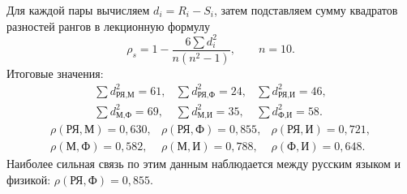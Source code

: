 Для каждой пары вычисляем $d_i = R_i-S_i$, затем подставляем сумму квадратов разностей рангов в лекционную формулу
\[
  \rho_s = 1 - \frac{6\sum d_i^2}{n(n^2-1)}, \qquad n=10.
\]
Итоговые значения:
\[
\begin{array}{lll}
  \sum d^2_{\text{РЯ},\text{М}}=61, &
  \sum d^2_{\text{РЯ},\text{Ф}}=24, &
  \sum d^2_{\text{РЯ},\text{И}}=46,\\
  \sum d^2_{\text{М},\text{Ф}}=69, &
  \sum d^2_{\text{М},\text{И}}=35, &
  \sum d^2_{\text{Ф},\text{И}}=58.
\end{array}
\]
\[
\begin{array}{lll}
  \rho(\text{РЯ},\text{М})=0{,}630, &
  \rho(\text{РЯ},\text{Ф})=0{,}855, &
  \rho(\text{РЯ},\text{И})=0{,}721,\\
  \rho(\text{М},\text{Ф})=0{,}582, &
  \rho(\text{М},\text{И})=0{,}788, &
  \rho(\text{Ф},\text{И})=0{,}648.
\end{array}
\]
Наиболее сильная связь по этим данным наблюдается между русским языком и физикой: $\rho(\text{РЯ},\text{Ф})=0{,}855$.

\clearpage
